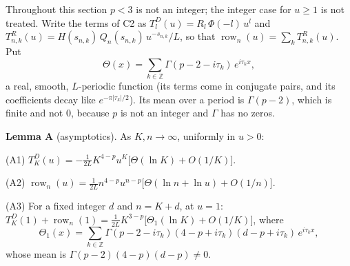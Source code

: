\documentclass[11pt]{article}
\newcommand{\row}{\operatorname{row}}
\begin{document}
Throughout this section $p<3$ is not an integer; the integer case for $u\ge1$ is not treated. Write the terms of C2 as $T^D_l(u)=R_l\,\Phi(-l)\,u^l$ and $T^R_{n,k}(u)=H(s_{n,k})\,Q_n(s_{n,k})\,u^{-s_{n,k}}/L$, so that $\row_n(u)=\sum_kT^R_{n,k}(u)$. Put
\[
\Theta(x)=\sum_{k\in\mathbb{Z}}\Gamma(p-2-i\tau_k)\,e^{i\tau_kx},
\]
a real, smooth, $L$-periodic function (its terms come in conjugate pairs, and its coefficients decay like $e^{-\pi|\tau_k|/2}$). Its mean over a period is $\Gamma(p-2)$, which is finite and not $0$, because $p$ is not an integer and $\Gamma$ has no zeros.

\medskip
\noindent\textbf{Lemma A} (asymptotics). As $K,n\to\infty$, uniformly in $u>0$:

(A1) $T^D_K(u)=-\frac{1}{2L}K^{4-p}u^K\bigl[\Theta(\ln K)+O(1/K)\bigr]$.

(A2) $\row_n(u)=\frac{1}{2L}n^{4-p}u^{n-p}\bigl[\Theta(\ln n+\ln u)+O(1/n)\bigr]$.

(A3) For a fixed integer $d$ and $n=K+d$, at $u=1$: $T^D_K(1)+\row_n(1)=\frac{1}{2L}K^{3-p}\bigl[\Theta_1(\ln K)+O(1/K)\bigr]$, where
\[
\Theta_1(x)=\sum_{k\in\mathbb{Z}}\Gamma(p-2-i\tau_k)(4-p+i\tau_k)(d-p+i\tau_k)\,e^{i\tau_kx},
\]
whose mean is $\Gamma(p-2)(4-p)(d-p)\ne0$.
\end{document}
